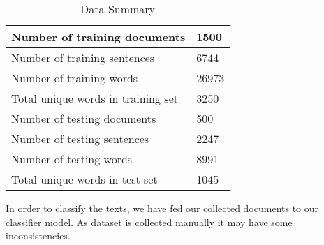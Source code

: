  \renewcommand{\arraystretch}{1.3}
\begin{table}[h!]
\begin{center}
\caption{Data Summary}
\begin{tabular}{||m{5.8cm} || m{2cm}||}
\hline
     Number of training documents & 1500 \\
\hline
    Number of training sentences & 6744\\
\hline
    Number of training words & 26973\\
\hline
    Total unique words in training set & 3250\\
\hline
\hline
     Number of testing documents & 500 \\
\hline
     Number of testing sentences & 2247\\
\hline 
     Number of testing words & 8991\\
\hline 
     Total unique words in test set & 1045\\
\hline
\end{tabular}
\label{data}
\end{center}
\end{table}
In order to classify the texts, we have fed our collected documents to our classifier model. As dataset is collected manually it may have some inconsistencies.